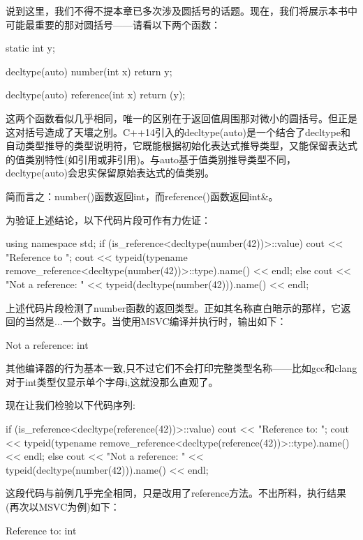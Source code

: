 
说到这里，我们不得不提本章已多次涉及圆括号的话题。现在，我们将展示本书中可能最重要的那对圆括号——请看以下两个函数：

\begin{cpp}
static int y;

decltype(auto) number(int x) {
  return y;
}

decltype(auto) reference(int x) {
  return (y);
}
\end{cpp}

这两个函数看似几乎相同，唯一的区别在于返回值周围那对微小的圆括号。但正是这对括号造成了天壤之别。C++14引入的decltype(auto)是一个结合了decltype和自动类型推导的类型说明符，它既能根据初始化表达式推导类型，又能保留表达式的值类别特性(如引用或非引用)。与auto基于值类别推导类型不同，decltype(auto)会忠实保留原始表达式的值类别。

简而言之：number()函数返回int，而reference()函数返回int\&。

为验证上述结论，以下代码片段可作有力佐证：

\begin{cpp}
using namespace std;
if (is_reference<decltype(number(42))>::value) {
  cout << "Reference to ";
  cout << typeid(typename
  remove_reference<decltype(number(42))>::type).name() << endl;
} else {
  cout << "Not a reference: " << typeid(decltype(number(42))).name() << endl;
}
\end{cpp}

上述代码片段检测了number函数的返回类型。正如其名称直白暗示的那样，它返回的当然是...一个数字。当使用MSVC编译并执行时，输出如下：

\begin{shell}
Not a reference: int
\end{shell}

其他编译器的行为基本一致,只不过它们不会打印完整类型名称——比如gcc和clang对于int类型仅显示单个字母i,这就没那么直观了。

现在让我们检验以下代码序列:

\begin{cpp}
if (is_reference<decltype(reference(42))>::value) {
  cout << "Reference to: ";
  cout << typeid(typename
  remove_reference<decltype(reference(42))>::type).name() << endl;
} else {
  cout << "Not a reference: " << typeid(decltype(number(42))).name() << endl;
}
\end{cpp}

这段代码与前例几乎完全相同，只是改用了reference方法。不出所料，执行结果(再次以MSVC为例)如下：

\begin{shell}
Reference to: int
\end{shell}


